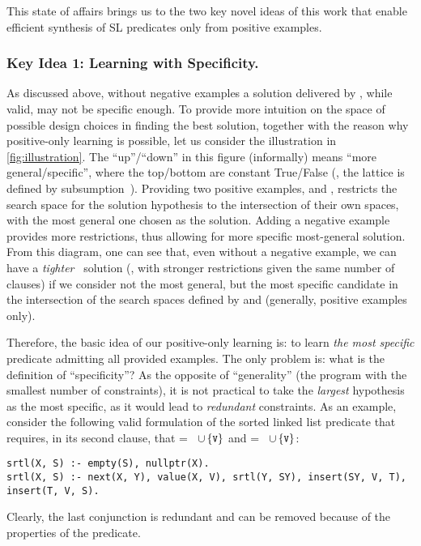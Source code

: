 This state of affairs brings us to the two key novel ideas of this
work that enable efficient synthesis of SL predicates only from
positive examples.

\subsubsection{Key Idea 1: Learning with Specificity.}
\label{sec:most-specific}


%
As discussed above, without negative examples a solution delivered by
\popper, while valid, may not be specific enough.
%
To provide more intuition on the space of possible design choices in
finding the best solution, together with the reason why positive-only
learning is possible, let us consider the illustration in
\autoref{fig:illustration}. The ``up''/``down'' in this figure
(informally) means ``more general/specific'', where the top/bottom
are constant True/False (\ie, the lattice is defined by
subsumption~\cite{muggleton1995inverse}).
%
Providing two positive examples,  and , restricts
the search space for the solution hypothesis to the intersection of
their own spaces, with the most general one chosen as the solution.
%
Adding a negative example  provides more restrictions, thus
allowing for more specific most-general solution.
%
From this diagram, one can see that, even without a negative example,
we can have a
\emph{tighter}~\cite{DBLP:journals/pacmpl/AstorgaSDWMX21} solution
(\ie, with stronger restrictions given the same number of clauses) if
we consider not the most general, but the most specific candidate in
the intersection of the search spaces defined by  and
 (generally, positive examples only).

Therefore, the basic idea of our positive-only learning is: to learn
\emph{the most specific} predicate admitting all provided examples.
The only problem is: what is the definition of ``specificity''? As the
opposite of ``generality'' (the program with the smallest number of
constraints), it is not practical to take the \emph{largest}
hypothesis as the most specific, as it would lead to \emph{redundant}
constraints.
%
As an example, consider the following valid formulation of the sorted
linked list predicate that requires, in its second clause, that
 = ~$\cup \left\{{\text{\small\ensuremath{\mathtt{V}}}}\right\}$ and  =
~$\cup \left\{{\text{\small\ensuremath{\mathtt{V}}}}\right\}$:
%
\begin{verbatim}
srtl(X, S) :- empty(S), nullptr(X).
srtl(X, S) :- next(X, Y), value(X, V), srtl(Y, SY), insert(SY, V, T), insert(T, V, S).
\end{verbatim}
%
Clearly, the last conjunction  is redundant and
can be removed because of the properties of the 
predicate.
%


